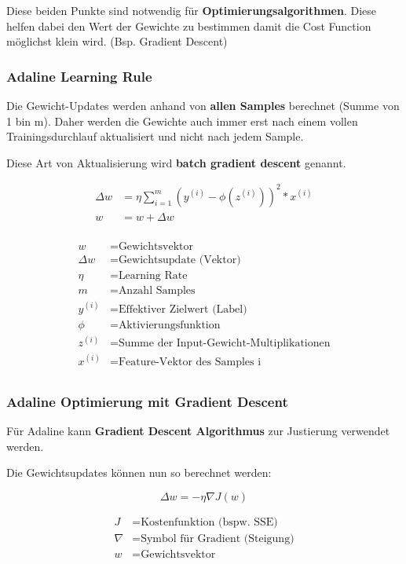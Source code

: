 Diese beiden Punkte sind notwendig für \textbf{Optimierungsalgorithmen}. Diese helfen dabei den Wert der Gewichte zu bestimmen damit die Cost Function möglichst klein wird. (Bsp. Gradient Descent)


\subsubsection{Adaline Learning Rule}

Die Gewicht-Updates werden anhand von \textbf{allen Samples} berechnet (Summe von 1 bin m). Daher werden die Gewichte auch immer erst nach einem vollen Trainingsdurchlauf aktualisiert und nicht nach jedem Sample.

Diese Art von Aktualisierung wird \textbf{batch gradient descent} genannt.

\begin{align*}
	\Delta w &= \eta \sum_{i=1}^{m} (y^{(i)} - \phi(z^{(i)}))^{2} * x^{(i)} \\
	w &= w + \Delta w \\
\end{align*}

\begin{align*}
	w &= \text{Gewichtsvektor} \\
	\Delta w &= \text{Gewichtsupdate (Vektor)} \\
	\eta &= \text{Learning Rate} \\
	m &= \text{Anzahl Samples}	\\
	y^{(i)} &= \text{Effektiver Zielwert (Label)} \\
	\phi &= \text{Aktivierungsfunktion} \\
	z^{(i)} &= \text{Summe der Input-Gewicht-Multiplikationen} \\
	x^{(i)} &= \text{Feature-Vektor des Samples i} \\
\end{align*}


\subsubsection{Adaline Optimierung mit Gradient Descent}

Für Adaline kann \textbf{Gradient Descent Algorithmus} zur Justierung verwendet werden.

Die Gewichtsupdates können nun so berechnet werden:

$$ \Delta w = - \eta \nabla J(w) $$

\begin{align*}
	J &= \text{Kostenfunktion (bspw. SSE)} \\
	\nabla &= \text{Symbol für Gradient (Steigung)} \\
	w &= \text{Gewichtsvektor} \\
\end{align*}


